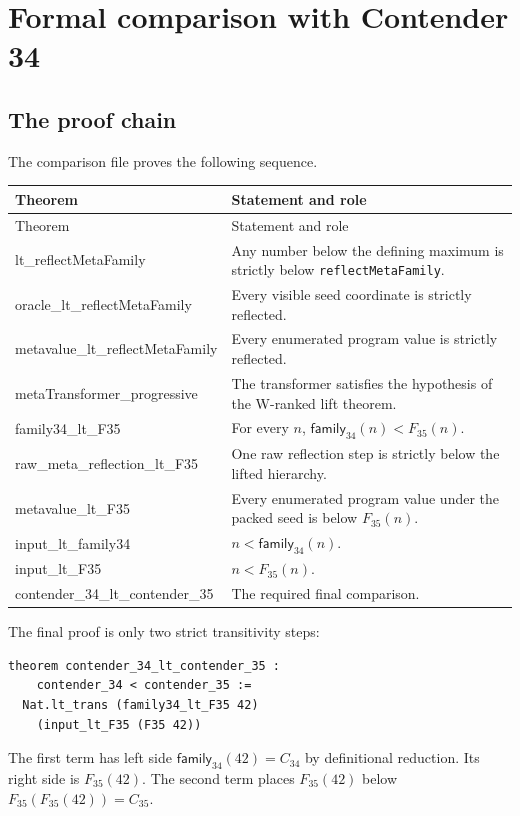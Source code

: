 \documentclass[11pt]{article}
\theoremstyle{definition}
\newcommand{\Cthirtyfour}{C_{34}}
\newcommand{\Cthirtyfive}{C_{35}}
\newcommand{\code}[1]{\texttt{#1}}
\begin{document}
\section{Formal comparison with Contender 34}

\subsection{The proof chain}

The comparison file proves the following sequence.

\begin{longtable}{>{\ttfamily}p{}p{}}
\toprule
\normalfont Theorem & Statement and role\\
\midrule
\endfirsthead
\toprule
\normalfont Theorem & Statement and role\\
\midrule
\endhead
lt\_reflectMetaFamily & Any number below the defining maximum is strictly below
\code{reflectMetaFamily}.\\
oracle\_lt\_reflectMetaFamily & Every visible seed coordinate is strictly
reflected.\\
metavalue\_lt\_reflectMetaFamily & Every enumerated program value is strictly
reflected.\\
metaTransformer\_progressive & The transformer satisfies the hypothesis of the
W-ranked lift theorem.\\
family34\_lt\_F35 & For every \(n\),
\(\mathsf{family}_{34}(n)<F_{35}(n)\).\\
raw\_meta\_reflection\_lt\_F35 & One raw reflection step is strictly below the
lifted hierarchy.\\
metavalue\_lt\_F35 & Every enumerated program value under the packed seed is
below \(F_{35}(n)\).\\
input\_lt\_family34 & \(n<\mathsf{family}_{34}(n)\).\\
input\_lt\_F35 & \(n<F_{35}(n)\).\\
contender\_34\_lt\_contender\_35 & The required final comparison.\\
\bottomrule
\end{longtable}

The final proof is only two strict transitivity steps:
\begin{lstlisting}
theorem contender_34_lt_contender_35 :
    contender_34 < contender_35 :=
  Nat.lt_trans (family34_lt_F35 42)
    (input_lt_F35 (F35 42))
\end{lstlisting}
The first term has left side
\(\mathsf{family}_{34}(42)=\Cthirtyfour\) by definitional reduction.  Its right
side is \(F_{35}(42)\).  The second term places \(F_{35}(42)\) below
\(F_{35}(F_{35}(42))=\Cthirtyfive\).
\end{document}
